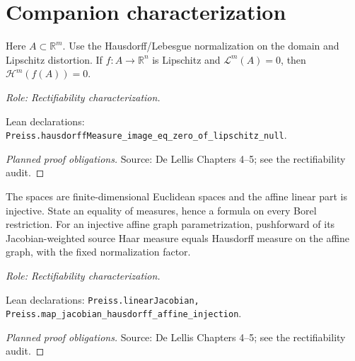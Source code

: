 \section{Companion characterization}

\begin{lemma}
\label{lem:lipschitz-null-image}







Here \(A\subset\mathbb R^m\). Use the Hausdorff/Lebesgue normalization on the domain and Lipschitz distortion.
If \(f:A\to\mathbb R^n\) is Lipschitz and \(\mathcal L^m(A)=0\), then \(\mathcal H^m(f(A))=0\).
\par\emph{Role: Rectifiability characterization.}
\par Lean declarations: \texttt{Preiss.hausdorffMeasure\_image\_eq\_zero\_of\_lipschitz\_null}.
\end{lemma}
\begin{proof}[Planned proof obligations]

\par Source: De Lellis Chapters 4--5; see the rectifiability audit.
\end{proof}

\begin{lemma}
\label{lem:graph-affine-area}







The spaces are finite-dimensional Euclidean spaces and the affine linear part is injective. State an equality of measures, hence a formula on every Borel restriction.
For an injective affine graph parametrization, pushforward of its Jacobian-weighted source Haar measure equals Hausdorff measure on the affine graph, with the fixed normalization factor.
\par\emph{Role: Rectifiability characterization.}
\par Lean declarations: \texttt{Preiss.linearJacobian, Preiss.map\_jacobian\_hausdorff\_affine\_injection}.
\end{lemma}
\begin{proof}[Planned proof obligations]

\par Source: De Lellis Chapters 4--5; see the rectifiability audit.
\end{proof}

